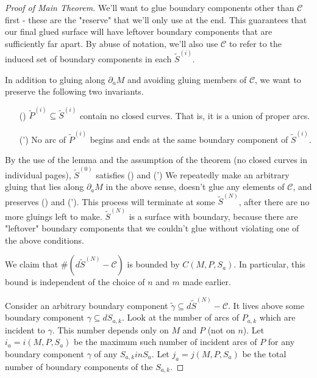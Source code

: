 \documentclass[12pt]{amsart}
\theoremstyle{definition}
\theoremstyle{remark}
\newcommand{\bd}{\partial}
\newcommand{\cin}{\subseteq}
\newcommand{\cC}{\mathcal{C}}
\begin{document}
\begin{proof}[Proof of Main Theorem]
We'll want to glue boundary components other than $\cC$ first - these are the
"reserve" that we'll only use at the end. This guarantees that our final glued
surface will have leftover boundary components that are sufficiently far apart.
By abuse of notation, we'll also use $\cC$ to refer to the induced set of
boundary components in each $\widetilde{S}^{(i)}$.

In addition to gluing along $\bd_aM$ and avoiding gluing members of $\cC$, we want
to preserve the following two invariants.


\begin{enumerate}

\item[(\dag)] $\widetilde{P}^{(i)} \cin \widetilde{S}^{(i)}$ contain no closed
curves.  That is, it is a union of proper arcs. \label{I:dag}

\item[(\dag')] No arc of $\widetilde{P}^{(i)}$ begins and ends at the same
boundary component of $\widetilde{S}^{(i)}$. \label{I:dag'}

\end{enumerate}

By the use of the lemma and the assumption of the theorem (no closed curves in
individual pages), $\widetilde{S}^{(0)}$ satisfies (\dag) and (\dag') We
repeatedly make an arbitrary gluing that lies along $\bd_aM$ in the above
sense, doesn't glue any elements of $\cC$, and preserves (\dag) and (\dag').  This
process will terminate at some $\widetilde{S}^{(N)}$, after there are no more
gluings left to make. $\widetilde{S}^{(N)}$ is a surface with boundary, because
there are "leftover" boundary components that we couldn't glue without
violating one of the above conditions.


We claim that $\#(d\widetilde{S}^{(N)} - \cC)$ is bounded by $C(M,P,S_a)$.  In
particular, this bound is independent of the choice of $n$ and $m$ made
earlier.


Consider an arbitrary boundary component $\widetilde{\gamma} \cin
d\widetilde{S}^{(N)} - \cC$.  It lives above some boundary component $\gamma
\cin dS_{a,k}$. Look at the number of arcs of $P_{a,k}$ which are incident to
$\gamma$. This number depends only on $M$ and $P$ (not on $n$). Let $i_a
= i(M,P,S_a)$ be the maximum such number of incident arcs of $P$ for any
boundary component $\gamma$ of any $S_{a,k} in S_a$. Let $j_a = j(M,P,S_a)$ be
the total number of boundary components of the $S_{a,k}$.


\end{proof}
\end{document}

